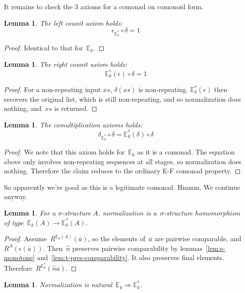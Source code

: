 \documentclass{article}
\theoremstyle{plain}
\newtheorem{lemma}[theorem]{Lemma}
\theoremstyle{definition}
\theoremstyle{remark}
\numberwithin{theorem}{section}
\begin{document}
It remains to check the 3 axioms for a comonad on comonoid form.
\begin{lemma}
The left counit axiom holds:
\begin{equation*}
    \epsilon_{\mathbb{E}^*_k} \circ \delta = 1
\end{equation*}
\end{lemma}
\begin{proof}
Identical to that for~$\mathbb{E}_k$.
\end{proof}
\begin{lemma}
The right counit axiom holds:
\begin{equation*}
    \mathbb{E}^*_k(\epsilon) \circ \delta = 1
\end{equation*}
\end{lemma}
\begin{proof}
For a non-repeating input $xs$, $\delta(xs)$ is non-repeating. $\mathbb{E}^*_k(\epsilon)$ then recovers the original list, which is still non-repeating, and so normalization does nothing, and~$xs$ is returned.
\end{proof}
\begin{lemma}
The comultiplication axioms holds:
\begin{equation*}
    \delta_{\mathbb{E}^*_k} \circ \delta = \mathbb{E}^*_k(\delta) \circ \delta
\end{equation*}
\end{lemma}
\begin{proof}
We note that this axiom holds for~$\mathbb{E}_k$ as it is a comonad. The equation above only involves non-repeating sequences at all stages, so normalization does nothing. Therefore the claim reduces to the ordinary E-F comonad property.
\end{proof}
So apparently we're good as this is a legitimate comonad. Hmmm. We continue anyway.
\begin{lemma}
For a $\sigma$-structure $A$, normalization is a~$\sigma$-structure homomorphism of type~$\mathbb{E}_k(A) \rightarrow \mathbb{E}^*_k(A)$.
\end{lemma}
\begin{proof}
Assume~$R^{\mathbb{E}_k(A)}(\overline{a})$, so the elements of~$\overline{a}$ are pairwise comparable, and~$R^A(\epsilon(\overline{a}))$. Then~$\hat{n}$ preserves pairwise comparability by lemmas~\ref{lem:s-monotone} and~\ref{lem:t-pres-comparability}. It also preserves final elements. Therefore~$R^{\mathbb{E}^*_k}(\hat{n}\overline{a})$.
\end{proof}
\begin{lemma}
\label{lem:n-natural}
Normalization is natural~$\mathbb{E}_k \Rightarrow \mathbb{E}^*_k$.
\end{lemma}
\end{document}

